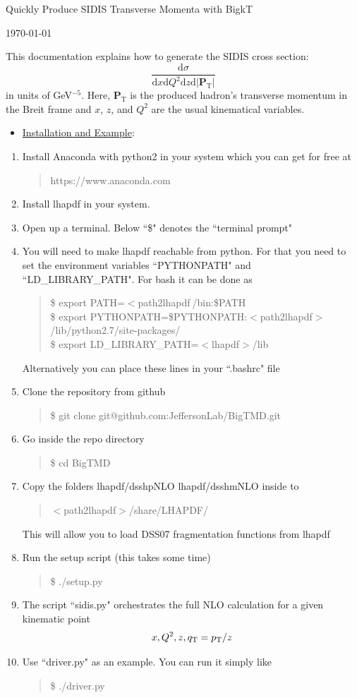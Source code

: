 \documentclass[12pt]{article}
\newcommand{\rquote}[1]{\textcolor{red}{ \begin{quote} #1 \end{quote}}}
\newcommand{\diff}[1]{\mathrm{d}#1}
\newcommand{\T}[1]{\boldsymbol{#1}_{\text{T}}}
\newcommand\3[1]{\boldsymbol{#1}}
\begin{document}
\centerline{Quickly Produce SIDIS Transverse Momenta with BigkT}
\centerline{\today}
\vspace{.25in}

This documentation explains how to generate the SIDIS cross section:
\begin{equation}
\frac{\diff{\sigma}{}}{\diff{x} \diff{Q^2} \diff{z} \diff{|\T{P}{}|} }
\end{equation}
in units of GeV$^{-5}$. Here, $\T{P}{}$ is the produced hadron's transverse momentum in the 
Breit frame and $x$, $z$, and $Q^2$ are the usual kinematical variables. 

\begin{itemize}
\item \underline{Installation and Example}:
\end{itemize}
\begin{enumerate}

\item Install Anaconda with python2 in your system which you can get for free at
     \rquote{https://www.anaconda.com}

\item Install lhapdf in your system. 

\item Open up a terminal. Below ``\$" denotes the ``terminal prompt"

\item You will need to make lhapdf reachable from python. For that you need 
      to set the environment variables ``PYTHONPATH" and
      ``LD\_LIBRARY\_PATH". For bash it can be
      done as
      \rquote{
      \$ export PATH=$<$path2lhapdf$\>$/bin:\$PATH \\
      \$ export PYTHONPATH=\$PYTHONPATH:$<$path2lhapdf$>$/lib/python2.7/site-packages/\\
      \$ export LD\_LIBRARY\_PATH=$<$lhapdf$>$/lib \\
      }
      Alternatively you can place these lines in your ``.bashrc" file

\item Clone the repository from github
     \rquote{\$ git clone git@github.com:JeffersonLab/BigTMD.git}

\item Go inside the repo directory
     \rquote{\$ cd BigTMD}

\item Copy the folders lhapdf/dsshpNLO  lhapdf/dsshmNLO inside to 
      \rquote{
      $<$path2lhapdf$>$/share/LHAPDF/
      }
      This will allow you to load DSS07 fragmentation functions from
      lhapdf 

\item Run the setup script (this takes some time)
      \rquote{\$ ./setup.py  }

\item The script ``sidis.py" orchestrates the full NLO calculation 
      for a given kinematic point 
        $$x,Q^2,z,q_{\rm T}=p_{\rm T}/z$$

\item Use ``driver.py" as an example. You can run it simply like 
      \rquote{\$ ./driver.py  }
\end{enumerate}
\end{document}
